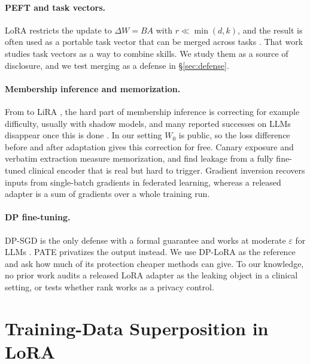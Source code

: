\documentclass[11pt]{article}
\newcommand{\Wz}{W_0}
\newcommand{\dW}{\Delta W}
\theoremstyle{plain}
\theoremstyle{definition}
\begin{document}
\paragraph{PEFT and task vectors.}
LoRA \citep{hu2022lora} restricts the update to $\dW=BA$ with $r \ll \min(d,k)$, and the result is often used as a portable task vector that can be merged across tasks \citep{ilharco2023task,yadav2023ties,yu2024dare}.
That work studies task vectors as a way to combine skills. We study them as a source of disclosure, and we test merging as a defense in \S\ref{sec:defense}.

\paragraph{Membership inference and memorization.}
From \citet{shokri2017membership} to LiRA \citep{carlini2022lira}, the hard part of membership inference is correcting for example difficulty, usually with shadow models, and many reported successes on LLMs disappear once this is done \citep{duan2024mia}.
In our setting $\Wz$ is public, so the loss difference before and after adaptation gives this correction for free.
Canary exposure \citep{carlini2019secret} and verbatim extraction \citep{carlini2021extracting,nasr2023scalable} measure memorization, and \citet{lehman2021bert} find leakage from a fully fine-tuned clinical encoder that is real but hard to trigger.
Gradient inversion \citep{zhu2019dlg,geiping2020inverting,balle2022reconstructing} recovers inputs from single-batch gradients in federated learning, whereas a released adapter is a sum of gradients over a whole training run.

\paragraph{DP fine-tuning.}
DP-SGD \citep{abadi2016dpsgd} is the only defense with a formal guarantee and works at moderate $\varepsilon$ for LLMs \citep{yu2022dpft,li2022llmdp}. PATE \citep{papernot2018scalable} privatizes the output instead.
We use DP-LoRA as the reference and ask how much of its protection cheaper methods can give.
To our knowledge, no prior work audits a released LoRA adapter as the leaking object in a clinical setting, or tests whether rank works as a privacy control.


\section{Training-Data Superposition in LoRA}
\label{sec:superposition}
\end{document}
